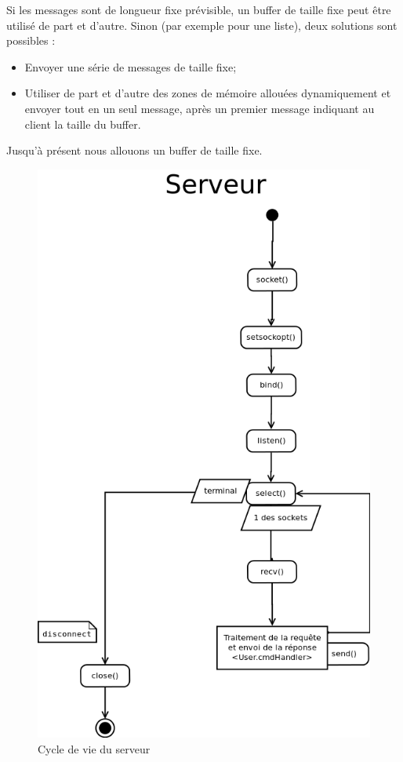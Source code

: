 \documentclass[a4paper,titlepage]{scrreprt}
\begin{document}
Si les messages sont de longueur fixe prévisible, un buffer de taille fixe peut être utilisé de part et d'autre.
Sinon (par exemple pour une liste), deux solutions sont possibles :
\begin{itemize}
  \item Envoyer une série de messages de taille fixe;
  \item Utiliser de part et d'autre des zones de mémoire allouées dynamiquement et envoyer tout en un seul message, après un premier message indiquant au client la taille du buffer.
\end{itemize}
Jusqu'à présent nous allouons un buffer de taille fixe.

    \begin{figure}[H]
    \center
    \includegraphics[scale=0.5]{uml/Serveur.png}
    \caption{Cycle de vie du serveur}
    \end{figure}
\end{document}
